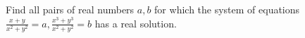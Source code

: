 Find all pairs of real numbers $a,b$ for which the system of equations $\frac{x+y}{x^2 +y^2} = a , \frac{x^3 +y^3}{x^2 +y^2} = b$ has a real solution.